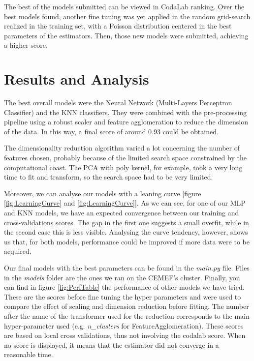 \documentclass[letterpaper,11pt]{article}
\begin{document}
The best of the models submitted can be viewed in CodaLab ranking. Over the best models found, another fine tuning was yet applied in the random grid-search realized in the training set, with a Poisson distribution centered in the best parameters of the estimators. Then, those new models were submitted, achieving a higher score.



\section{Results and Analysis}
The best overall models were the Neural Network (Multi-Layers Perceptron Classifier) and the KNN classifiers. They were combined with the pre-processing pipeline using a robust scaler and feature agglomeration to reduce the dimension of the data. In this way, a final score of around 0.93 could be obtained.

The dimensionality reduction algorithm varied a lot concerning the number of features chosen, probably because of the limited search space constrained by the computational coast. The PCA with poly kernel, for example, took a very long time to fit and transform, so the search space had to be very limited.

Moreover, we can analyse our models with a leaning curve [figure \ref{fig:LearningCurve} and \ref{fig:LearningCurve}]. As we can see, for one of our MLP and KNN models, we have an expected convergence between our training and cross-validations scores. The gap in the first one suggests a small overfit, while in the second case this is less visible. Analysing the curve tendency, however, shows us that, for both models, performance could be improved if more data were to be acquired.

Our final models with the best parameters can be found in the \textit{main.py}
file. Files in the \textit{models} folder are the ones we ran on the CEMEF's
cluster. Finally, you can find in figure \ref{fig:PerfTable} the performance of
other models we have tried. These are the scores before fine tuning the
hyper parameters and were used to compare the effect of scaling and dimension
reduction before fitting. The number after the name of the transformer used for
the reduction corresponds to the main hyper-parameter used
(e.g. \textit{n\_clusters} for FeatureAgglomeration). These scores are based on
local cross validations, thus not involving the codalab score. When no score is
displayed, it means that the estimator did not converge in a reasonable time.
\end{document}
